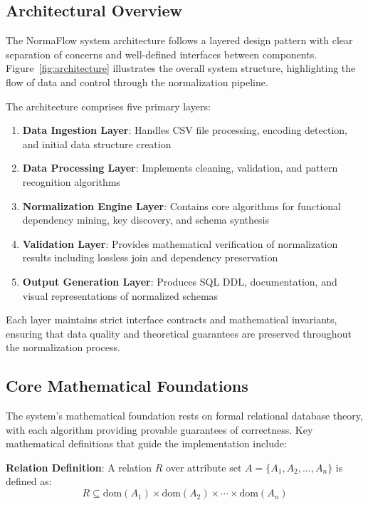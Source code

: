 \documentclass[acmsmall]{acmart}
\begin{document}
\subsection{Architectural Overview}

The NormaFlow system architecture follows a layered design pattern with clear separation of concerns and well-defined interfaces between components. Figure~\ref{fig:architecture} illustrates the overall system structure, highlighting the flow of data and control through the normalization pipeline.

The architecture comprises five primary layers:

\begin{enumerate}
\item \textbf{Data Ingestion Layer}: Handles CSV file processing, encoding detection, and initial data structure creation
\item \textbf{Data Processing Layer}: Implements cleaning, validation, and pattern recognition algorithms
\item \textbf{Normalization Engine Layer}: Contains core algorithms for functional dependency mining, key discovery, and schema synthesis
\item \textbf{Validation Layer}: Provides mathematical verification of normalization results including lossless join and dependency preservation
\item \textbf{Output Generation Layer}: Produces SQL DDL, documentation, and visual representations of normalized schemas
\end{enumerate}

Each layer maintains strict interface contracts and mathematical invariants, ensuring that data quality and theoretical guarantees are preserved throughout the normalization process.

\subsection{Core Mathematical Foundations}

The system's mathematical foundation rests on formal relational database theory, with each algorithm providing provable guarantees of correctness. Key mathematical definitions that guide the implementation include:

\textbf{Relation Definition}: A relation $R$ over attribute set $A = \{A_1, A_2, \ldots, A_n\}$ is defined as:
\begin{equation}
R \subseteq \text{dom}(A_1) \times \text{dom}(A_2) \times \cdots \times \text{dom}(A_n)
\end{equation}
\end{document}
